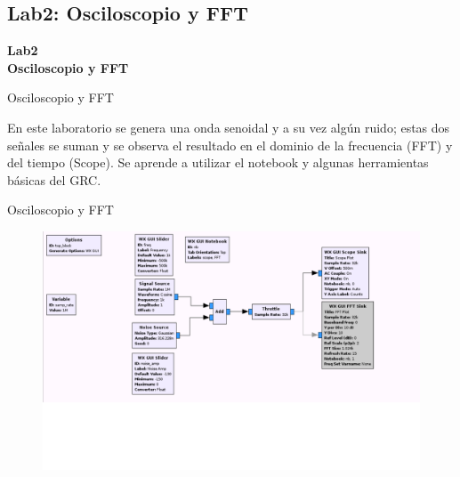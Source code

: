 \subsection{Lab2: Osciloscopio y FFT}
\begin{frame}{}


\bfseries{\textrm{\LARGE Lab2\\ \Large Osciloscopio y FFT}}
\raggedright
\end{frame}

\begin{frame}{Osciloscopio y FFT}


En este laboratorio se genera una onda senoidal y a su vez algún ruido; estas dos señales se suman y se observa el resultado en el dominio de la frecuencia (FFT) y del tiempo (Scope). Se aprende a utilizar el notebook y algunas herramientas básicas del GRC. 

\end{frame}

\begin{frame}{Osciloscopio y FFT}

\begin{figure}[H]
\vspace{-4mm}
\centering
\includegraphics[width=1.2\textwidth]{parte1/lab2/pdf/lab2_1.pdf}
\end{figure}
\end{frame}

